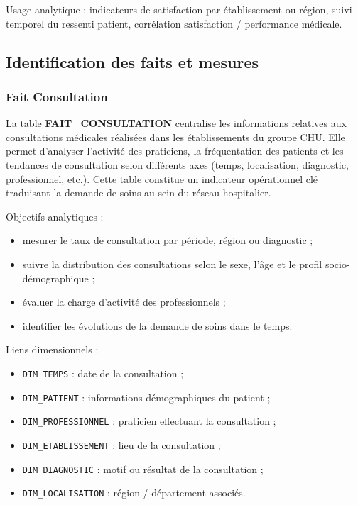 \documentclass[12pt,a4paper]{article}
\begin{document}
Usage analytique : indicateurs de satisfaction par établissement ou région, suivi temporel du ressenti patient, corrélation satisfaction / performance médicale.

\subsection{Identification des faits et mesures}

\subsubsection{Fait Consultation}

La table \textbf{FAIT\_CONSULTATION} centralise les informations relatives aux consultations médicales réalisées dans les établissements du groupe CHU. Elle permet d’analyser l’activité des praticiens, la fréquentation des patients et les tendances de consultation selon différents axes (temps, localisation, diagnostic, professionnel, etc.). Cette table constitue un indicateur opérationnel clé traduisant la demande de soins au sein du réseau hospitalier.

Objectifs analytiques :
\begin{itemize}
    \item mesurer le taux de consultation par période, région ou diagnostic ;
    \item suivre la distribution des consultations selon le sexe, l’âge et le profil socio-démographique ;
    \item évaluer la charge d’activité des professionnels ;
    \item identifier les évolutions de la demande de soins dans le temps.
\end{itemize}

Liens dimensionnels :
\begin{itemize}
    \item \texttt{DIM\_TEMPS} : date de la consultation ;
    \item \texttt{DIM\_PATIENT} : informations démographiques du patient ;
    \item \texttt{DIM\_PROFESSIONNEL} : praticien effectuant la consultation ;
    \item \texttt{DIM\_ETABLISSEMENT} : lieu de la consultation ;
    \item \texttt{DIM\_DIAGNOSTIC} : motif ou résultat de la consultation ;
    \item \texttt{DIM\_LOCALISATION} : région / département associés.
\end{itemize}
\end{document}
